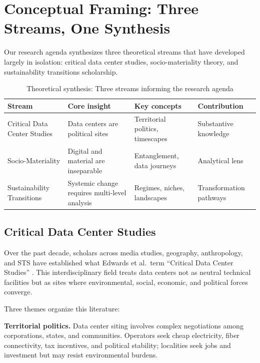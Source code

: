 \documentclass[../../main.tex]{subfiles}
\begin{document}
\section{Conceptual Framing: Three Streams, One Synthesis}

Our research agenda synthesizes three theoretical streams that have developed largely in isolation: critical data center studies, socio-materiality theory, and sustainability transitions scholarship.

\begin{table}[h]
\caption{Theoretical synthesis: Three streams informing the research agenda}
\begin{tabular}{p{2.5cm}p{3cm}p{2.5cm}p{2.5cm}}
\toprule
\textbf{Stream} & \textbf{Core insight} & \textbf{Key concepts} & \textbf{Contribution} \\
\midrule
Critical Data Center Studies & Data centers are political sites & Territorial politics, timescapes & Substantive knowledge \\
\addlinespace
Socio-Materiality & Digital and material are inseparable & Entanglement, data journeys & Analytical lens \\
\addlinespace
Sustainability Transitions & Systemic change requires multi-level analysis & Regimes, niches, landscapes & Transformation pathways \\
\bottomrule
\end{tabular}
\end{table}

\subsection{Critical Data Center Studies}

Over the past decade, scholars across media studies, geography, anthropology, and STS have established what Edwards et al.\ term ``Critical Data Center Studies'' . This interdisciplinary field treats data centers not as neutral technical facilities but as sites where environmental, social, economic, and political forces converge.

Three themes organize this literature:

\textbf{Territorial politics.} Data center siting involves complex negotiations among corporations, states, and communities. Operators seek cheap electricity, fiber connectivity, tax incentives, and political stability; localities seek jobs and investment but may resist environmental burdens.
\end{document}
